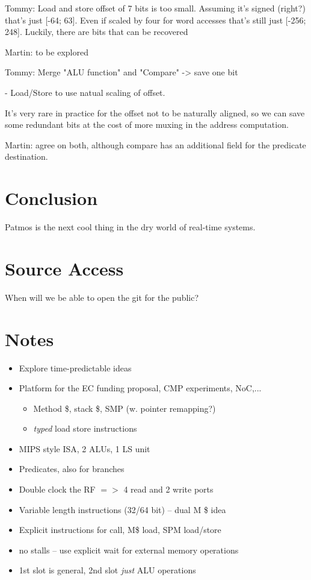 \documentclass{IEEEtran}
\newcommand{\tommy}[1]{{\color{red} Tommy: #1}}
\newcommand{\martin}[1]{{\color{blue} Martin: #1}}
\begin{document}
\tommy{
Load and store offset of 7 bits is too small. Assuming it's signed
(right?) that's just [-64; 63]. Even if scaled by four for word
accesses that's still just [-256; 248]. Luckily, there are bits that can
be recovered}

\martin{to be explored}

\tommy{ Merge "ALU function" and "Compare" -> save one bit

- Load/Store to use natual scaling of offset.

 It's very rare in practice for the offset not to be naturally
 aligned, so we can save some redundant bits at the cost of more
 muxing in the address computation.}
 
 \martin{agree on both, although compare has an additional field for
 the predicate destination.}




\section{Conclusion}
\label{sec:conclusion}

Patmos is the next cool thing in the dry world of real-time systems.



\section*{Source Access}

When will we be able to open the git for the public?





\appendix

\section{Notes}

\begin{itemize}
\item Explore time-predictable ideas
\item Platform for the EC funding proposal, CMP experiments, NoC,...
\begin{itemize}
\item Method \$, stack \$, SMP (w. pointer remapping?)
\item \emph{typed} load store instructions
\end{itemize}
\item MIPS style ISA, 2 ALUs, 1 LS unit
\item Predicates, also for branches
\item Double clock the RF $=>$ 4 read and 2 write ports
\item Variable length instructions (32/64 bit) -- dual M \$ idea
\item Explicit instructions for call, M\$ load, SPM load/store
\item no stalls -- use explicit wait for external memory operations
\item 1st slot is general, 2nd slot \emph{just} ALU operations
\end{itemize}
\end{document}
